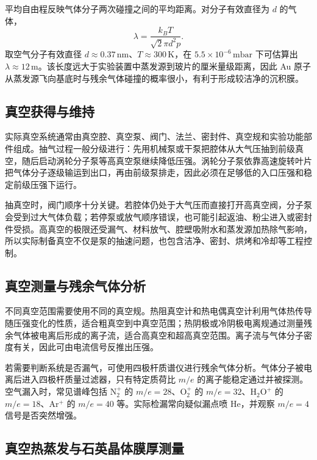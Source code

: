 \documentclass[11pt]{article}
\begin{document}
平均自由程反映气体分子两次碰撞之间的平均距离。对分子有效直径为 $d$ 的气体，
\begin{equation}
    \lambda=\frac{k_B T}{\sqrt{2}\pi d^2 p}.
    \label{eq:mean_free_path}
\end{equation}
取空气分子有效直径 $d\approx0.37\,\mathrm{nm}$、$T\approx300\,\mathrm{K}$，在 $5.5\times10^{-6}\,\mathrm{mbar}$ 下可估算出 $\lambda\approx 12\,\mathrm{m}$。该长度远大于实验装置中蒸发源到玻片的厘米量级距离，因此 Au 原子从蒸发源飞向基底时与残余气体碰撞的概率很小，有利于形成较洁净的沉积膜。

\subsection{真空获得与维持}

实际真空系统通常由真空腔、真空泵、阀门、法兰、密封件、真空规和实验功能部件组成。抽气过程一般分级进行：先用机械泵或干泵把腔体从大气压抽到前级真空，随后启动涡轮分子泵等高真空泵继续降低压强。涡轮分子泵依靠高速旋转叶片把气体分子逐级输运到出口，再由前级泵排走，因此必须在足够低的入口压强和稳定前级压强下运行。

抽真空时，阀门顺序十分关键。若腔体仍处于大气压而直接打开高真空阀，分子泵会受到过大气体负载；若停泵或放气顺序错误，也可能引起返油、粉尘进入或密封件受损。高真空的极限还受漏气、材料放气、腔壁吸附水和蒸发源加热除气影响，所以实际制备真空不仅是泵的抽速问题，也包含洁净、密封、烘烤和冷却等工程控制。

\subsection{真空测量与残余气体分析}

不同真空范围需要使用不同的真空规。热阻真空计和热电偶真空计利用气体热传导随压强变化的性质，适合粗真空到中真空范围；热阴极或冷阴极电离规通过测量残余气体被电离后形成的离子流，适合高真空和超高真空范围。离子流与气体分子密度有关，因此可由电流信号反推出压强。

若需要判断系统是否漏气，可使用四极杆质谱仪进行残余气体分析。气体分子被电离后进入四极杆质量过滤器，只有特定质荷比 $m/e$ 的离子能稳定通过并被探测。空气漏入时，常见谱峰包括 $\mathrm{N_2^+}$ 的 $m/e=28$、$\mathrm{O_2^+}$ 的 $m/e=32$、$\mathrm{H_2O^+}$ 的 $m/e=18$、$\mathrm{Ar^+}$ 的 $m/e=40$ 等。实际检漏常向疑似漏点喷 He，并观察 $m/e=4$ 信号是否突然增强。

\subsection{真空热蒸发与石英晶体膜厚测量}
\end{document}
